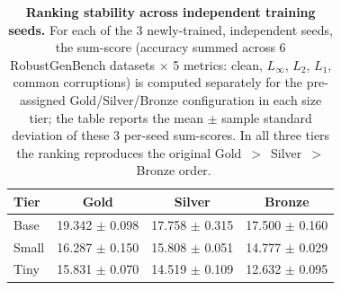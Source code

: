 
\begin{table}[t]
\centering
\caption{\textbf{Ranking stability across independent training seeds.} For
each of the 3 newly-trained, independent seeds, the sum-score (accuracy
summed across 6 RobustGenBench datasets $\times$ 5 metrics: clean,
$L_\infty$, $L_2$, $L_1$, common corruptions) is computed separately for the
pre-assigned Gold/Silver/Bronze configuration in each size tier; the table
reports the mean $\pm$ sample standard deviation of these 3 per-seed
sum-scores. In all three tiers the ranking reproduces the original
Gold~$>$~Silver~$>$~Bronze order.}
\label{tab:seed-stability}
\begin{tabular}{lccc}
\toprule
Tier & Gold & Silver & Bronze \\
\midrule
Base  & 19.342 $\pm$ 0.098 & 17.758 $\pm$ 0.315 & 17.500 $\pm$ 0.160 \\
Small & 16.287 $\pm$ 0.150 & 15.808 $\pm$ 0.051 & 14.777 $\pm$ 0.029 \\
Tiny  & 15.831 $\pm$ 0.070 & 14.519 $\pm$ 0.109 & 12.632 $\pm$ 0.095 \\
\bottomrule
\end{tabular}
\end{table}


